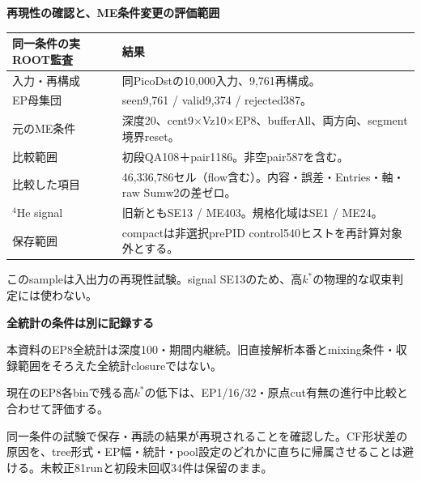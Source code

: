 \documentclass[11pt,a4paper,landscape]{article}
\newcommand{\ttl}[2]{{\small\color{teal}#1}\par{\fontsize{20}{25}\selectfont\bfseries #2}\par\vspace{2mm}}
\newcommand{\note}[1]{\par\colorbox{pale}{\parbox{\dimexpr\linewidth-5mm\relax}{\vspace{1mm}\small #1\vspace{1mm}}}\par}
\newcommand{\warn}[1]{\par\colorbox{warm}{\parbox{\dimexpr\linewidth-5mm\relax}{\vspace{1mm}\small #1\vspace{1mm}}}\par}
\begin{document}
\clearpage\ttl{10 / tree導入で何を確認できたか}{再現性の確認と、ME条件変更の評価範囲}
\begin{minipage}[t]{.56\linewidth}\vspace{0pt}
\begin{tabular}{P{50mm}P{94mm}}
\toprule 同一条件の実ROOT監査 & 結果\\\midrule
入力・再構成 & 同PicoDstの10,000入力、9,761再構成。\\
EP母集団 & seen9,761 / valid9,374 / rejected387。\\
元のME条件 & 深度20、cent9$\times$Vz10$\times$EP8、bufferAll、両方向、segment境界reset。\\
比較範囲 & 初段QA108＋pair1186。非空pair587を含む。\\
比較した項目 & 46,336,786セル（flow含む）。内容・誤差・Entries・軸・raw Sumw2の差ゼロ。\\
$^4$He signal & 旧新ともSE13 / ME403。規格化域はSE1 / ME24。\\
保存範囲 & compactは非選択prePID control540ヒストを再計算対象外とする。\\\bottomrule
\end{tabular}
\note{このsampleは入出力の再現性試験。signal SE13のため、高$k^*$の物理的な収束判定には使わない。}
\end{minipage}\hfill
\begin{minipage}[t]{.40\linewidth}\vspace{0pt}
\begin{center}\end{center}
\textbf{全統計の条件は別に記録する}\par
本資料のEP8全統計は深度100・期間内継続。旧直接解析本番とmixing条件・収録範囲をそろえた全統計closureではない。\par
現在のEP8各binで残る高$k^*$の低下は、EP1/16/32・原点cut有無の進行中比較と合わせて評価する。
\end{minipage}
\warn{同一条件の試験で保存・再読の結果が再現されることを確認した。CF形状差の原因を、tree形式・EP幅・統計・pool設定のどれかに直ちに帰属させることは避ける。未較正81runと初段未回収34件は保留のまま。}
\end{document}
